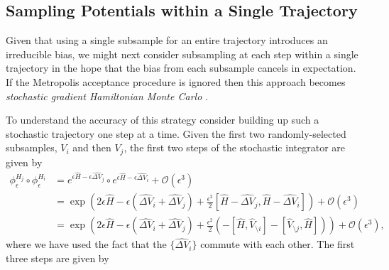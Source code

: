 \documentclass{article}
\begin{document}
\subsection{Sampling Potentials within a Single Trajectory}

Given that using a single subsample for an entire trajectory introduces an
irreducible bias, we might next consider subsampling at each step within
a single trajectory in the hope that the bias from each subsample cancels
in expectation.  If the Metropolis acceptance procedure is ignored then this 
approach becomes \textit{stochastic gradient Hamiltonian Monte Carlo}
\cite{ChenEtAl:2014}.

To understand the accuracy of this strategy consider building up such a 
stochastic trajectory one step at a time.  Given the first two randomly-selected 
subsamples, $V_{i}$ and then $V_{j}$, the first two steps of the stochastic
integrator are given by
%
\begin{align*}
\phi^{H_{j}}_{\epsilon} \circ \phi^{H_{i}}_{\epsilon}
&=
e^{ \epsilon \hat{H} - \epsilon  \widehat{ \Delta V}_{j} } 
\circ e^{ \epsilon \hat{H} - \epsilon  \widehat{ \Delta V}_{i} }
+ \mathcal{O} \! \left( \epsilon^{3} \right)
\\
&=
\exp \! \left( 
2 \epsilon \hat{H} - \epsilon \left(  \widehat{ \Delta V}_{i} +  \widehat{ \Delta V}_{j} \right)
+ \frac{\epsilon^{2}}{2} \left[ \hat{H} -  \widehat{ \Delta V}_{j}, \hat{H} - \widehat{ \Delta V}_{i} \right]
\right)
+ \mathcal{O} \! \left( \epsilon^{3} \right)
\\
&=
\exp \! \left( 
2 \epsilon \hat{H} - \epsilon \left( \widehat{ \Delta V}_{i} + \widehat{ \Delta V}_{j} \right)
+ \frac{\epsilon^{2}}{2} \left(
- \left[ \hat{H}, \hat{V}_{\setminus i} \right]
- \left[ \hat{V}_{\setminus j}, \hat{H} \right] \right) \right)
+ \mathcal{O} \! \left( \epsilon^{3} \right),
\end{align*}
%
where we have used the fact that the $\{ \widehat{ \Delta V}_{i} \}$ commute
with each other.  The first three steps are given by
%
\end{document}
